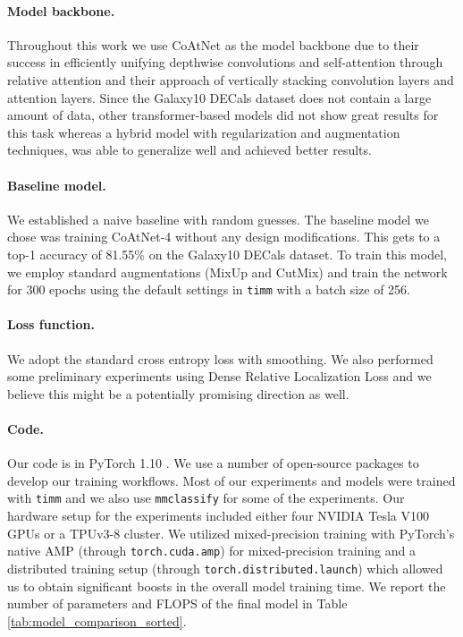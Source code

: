 \documentclass{article} \usepackage{iclr2023_conference,times}
\begin{document}
\paragraph{Model backbone. } Throughout this work we use CoAtNet as the model backbone due to their success in efficiently unifying depthwise convolutions and self-attention through relative attention and their approach of vertically stacking convolution layers and attention layers. Since the Galaxy10 DECals dataset does not contain a large amount of data, other transformer-based models did not show great results for this task whereas a hybrid model with regularization and augmentation techniques, was able to generalize well and achieved better results.

\paragraph{Baseline model. } We established a naive baseline with random guesses. The baseline model we chose was training CoAtNet-4 without any design modifications. This gets to a top-1 accuracy of 81.55\% on the Galaxy10 DECals dataset. To train this model, we employ standard augmentations (MixUp and CutMix) and train the network for 300 epochs using the default settings in \texttt{timm} with a batch size of 256.

\paragraph{Loss function.} We adopt the standard cross entropy loss with smoothing. We also performed some preliminary experiments using Dense Relative Localization Loss \citep{liu2021efficient} and we believe this might be a potentially promising direction as well.

\paragraph{Code. } Our code is in PyTorch 1.10 \citep{paszke2019pytorch}. We use a number of open-source packages to develop our training workflows. Most of our experiments and models were trained with \texttt{timm} \citep{rw2019timm} and we also use \texttt{mmclassify} \citep{2020mmclassification} for some of the experiments. Our hardware setup for the experiments included either four NVIDIA Tesla V100 GPUs or a TPUv3-8 cluster. We utilized mixed-precision training with PyTorch's native AMP (through \texttt{torch.cuda.amp}) for mixed-precision training and a distributed training setup (through \texttt{torch.distributed.launch}) which allowed us to obtain significant boosts in the overall model training time. We report the number of parameters and FLOPS of the final model in Table \ref{tab:model_comparison_sorted}.
\end{document}

